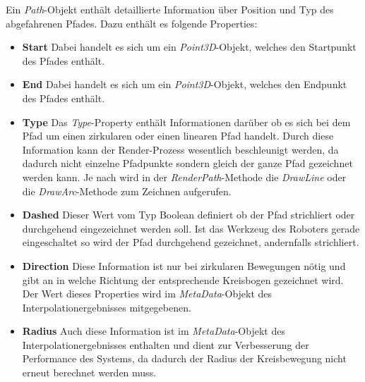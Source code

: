 Ein \textit{Path}-Objekt enthält detaillierte Information über Position und Typ des abgefahrenen Pfades. Dazu enthält es folgende Properties:
\begin{itemize}
\item \textbf{Start}
Dabei handelt es sich um ein \textit{Point3D}-Objekt, welches den Startpunkt des Pfades enthält.
\item \textbf{End}
Dabei handelt es sich um ein \textit{Point3D}-Objekt, welches den Endpunkt des Pfades enthält.
\item \textbf{Type}
Das \textit{Type}-Property enthält Informationen darüber ob es sich bei dem Pfad um einen zirkularen oder einen linearen Pfad handelt. Durch diese Information kann der Render-Prozess wesentlich beschleunigt werden, da dadurch nicht einzelne Pfadpunkte sondern gleich der ganze Pfad gezeichnet werden kann.
Je nach wird in der \textit{RenderPath}-Methode die \textit{DrawLine} oder die \textit{DrawArc}-Methode zum Zeichnen aufgerufen.
\item \textbf{Dashed}
Dieser Wert vom Typ Boolean definiert ob der Pfad strichliert oder durchgehend eingezeichnet werden soll. Ist das Werkzeug des Roboters gerade eingeschaltet so wird der Pfad durchgehend gezeichnet, andernfalls strichliert.
\item \textbf{Direction}
Diese Information ist nur bei zirkularen Bewegungen nötig und gibt an in welche Richtung der entsprechende Kreisbogen gezeichnet wird. Der Wert dieses Properties wird im \textit{MetaData}-Objekt des Interpolationergebnisses mitgegebenen.
\item \textbf{Radius}
Auch diese Information ist im \textit{MetaData}-Objekt des Interpolationergebnisses enthalten und dient zur Verbesserung der Performance des Systems, da dadurch der Radius der Kreisbewegung nicht erneut berechnet werden muss.

\end{itemize}
